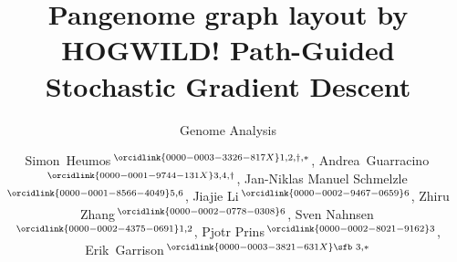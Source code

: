 \documentclass{bioinfo}
\theoremstyle{definition}
\begin{document}

\subtitle{Genome Analysis}

\title[Pangenome graph layout by HOGWILD! Path-Guided Stochastic Gradient Descent]{Pangenome graph layout by HOGWILD! Path-Guided Stochastic Gradient Descent}
\author[Heumos, Guarracino \textit{et~al}.]{
Simon~Heumos\,$^{\orcidlink{0000-0003-3326-817X}1,2,\dagger,*}$,
Andrea~Guarracino\,$^{\orcidlink{0000-0001-9744-131X}3,4,\dagger}$,
Jan-Niklas Manuel Schmelzle\,$^{\orcidlink{0000-0001-8566-4049}5,6}$,
Jiajie Li\,$^{\orcidlink{0000-0002-9467-0659}6}$,
Zhiru Zhang\,$^{\orcidlink{0000-0002-0778-0308}6}$,
Sven Nahnsen\,$^{\orcidlink{0000-0002-4375-0691}1,2}$,
Pjotr Prins\,$^{\orcidlink{0000-0002-8021-9162}3}$,
Erik~Garrison\,$^{\orcidlink{0000-0003-3821-631X}\text{\sfb 3},*}$
}

\address{
$^1$Quantitative Biology Center (QBiC), University of Tübingen, Tübingen 72076, Germany \\
$^2$Biomedical Data Science, Department of Computer Science, University of Tübingen, Tübingen 72076, Germany \\
$^3$Department of Genetics, Genomics and Informatics, University of Tennessee Health Science Center, Memphis, TN 38163, USA \\
$^4$Genomics Research Centre, Human Technopole, Milan 20157, Italy \\
$^5$Department of Computer Engineering, School of Computation, Information and Technology (CIT), Technical University of Munich, Munich 80333, Germany \\
$^6$School of Electrical and Computer Engineering, Cornell University, Ithaca, NY 14853, USA \\
}



\end{document}
